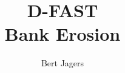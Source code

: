 \documentclass{deltares_manual}
\begin{document}
\title{D-FAST\\ Bank Erosion}
\subtitle{}

\author{Bert Jagers}

\deltarestitle
%







%

\appendix


\end{document}
